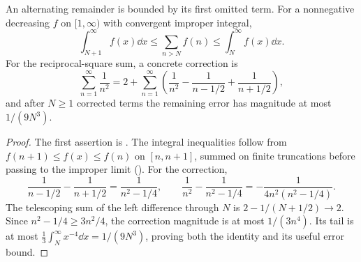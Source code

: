 \begin{proposition}
An alternating remainder is bounded by its first omitted term. For a nonnegative decreasing $f$ on $[1,\infty)$ with convergent improper integral,
\[\int_{N+1}^\infty f(x)\dd x\leq\sum_{n>N}f(n)\leq\int_N^\infty f(x)\dd x.\]
For the reciprocal-square sum, a concrete correction is
\[\sum_{n=1}^\infty\frac1{n^2}=2+\sum_{n=1}^\infty\left(\frac1{n^2}-\frac1{n-1/2}+\frac1{n+1/2}\right),\]
and after $N\ge 1$ corrected terms the remaining error has magnitude at most $1/(9N^3)$.
\end{proposition}
\begin{proof}
The first assertion is . The integral inequalities follow from $f(n+1)\leq f(x)\leq f(n)$ on $[n,n+1]$, summed on finite truncations before passing to the improper limit (). For the correction,
\[\frac1{n-1/2}-\frac1{n+1/2}=\frac1{n^2-1/4},\qquad
\frac1{n^2}-\frac1{n^2-1/4}=-\frac1{4n^2(n^2-1/4)}.\]
The telescoping sum of the left difference through $N$ is $2-1/(N+1/2)\to2$. Since $n^2-1/4\geq3n^2/4$, the correction magnitude is at most $1/(3n^4)$. Its tail is at most $\frac13\int_N^\infty x^{-4}\dd x=1/(9N^3)$, proving both the identity and its useful error bound.
\end{proof}
